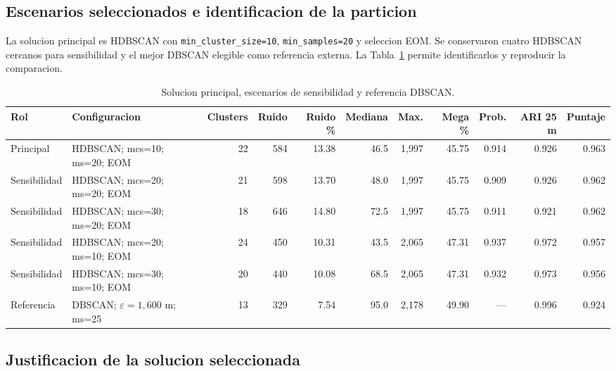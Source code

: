 \documentclass[11pt,letterpaper]{article}
\begin{document}
\subsection{Escenarios seleccionados e identificacion de la particion}

La solucion principal es HDBSCAN con \texttt{min\_cluster\_size=10}, \texttt{min\_samples=20} y seleccion EOM. Se conservaron cuatro HDBSCAN cercanos para sensibilidad y el mejor DBSCAN elegible como referencia externa. La Tabla~\ref{tab:escenarios-seleccionados} permite identificarlos y reproducir la comparacion.

\begin{landscape}
\begin{table}[H]
\centering
\scriptsize
\caption{Solucion principal, escenarios de sensibilidad y referencia DBSCAN.}
\label{tab:escenarios-seleccionados}
\begin{tabular}{p{2.2cm}p{5.4cm}rrrrrrrrr}
\toprule
\textbf{Rol} & \textbf{Configuracion} & \textbf{Clusters} & \textbf{Ruido} & \textbf{Ruido \%} & \textbf{Mediana} & \textbf{Max.} & \textbf{Mega \%} & \textbf{Prob.} & \textbf{ARI 25 m} & \textbf{Puntaje} \\
\midrule
Principal & HDBSCAN; mcs=10; ms=20; EOM & 22 & 584 & 13.38 & 46.5 & 1,997 & 45.75 & 0.914 & 0.926 & 0.963 \\
Sensibilidad & HDBSCAN; mcs=20; ms=20; EOM & 21 & 598 & 13.70 & 48.0 & 1,997 & 45.75 & 0.909 & 0.926 & 0.962 \\
Sensibilidad & HDBSCAN; mcs=30; ms=20; EOM & 18 & 646 & 14.80 & 72.5 & 1,997 & 45.75 & 0.911 & 0.921 & 0.962 \\
Sensibilidad & HDBSCAN; mcs=20; ms=10; EOM & 24 & 450 & 10.31 & 43.5 & 2,065 & 47.31 & 0.937 & 0.972 & 0.957 \\
Sensibilidad & HDBSCAN; mcs=30; ms=10; EOM & 20 & 440 & 10.08 & 68.5 & 2,065 & 47.31 & 0.932 & 0.973 & 0.956 \\
Referencia & DBSCAN; $\varepsilon=1,600$ m; ms=25 & 13 & 329 & 7.54 & 95.0 & 2,178 & 49.90 & --- & 0.996 & 0.924 \\
\bottomrule
\end{tabular}
\end{table}
\end{landscape}

\subsection{Justificacion de la solucion seleccionada}
\end{document}
